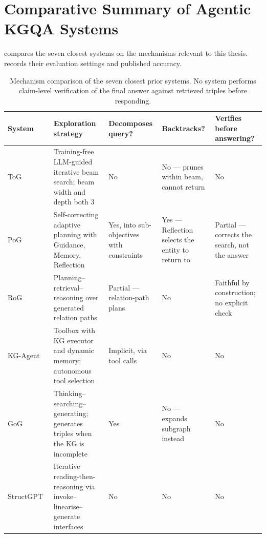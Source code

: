 \section{Comparative Summary of Agentic KGQA
Systems}\label{sec:comparison-table}

 compares the seven closest systems on the mechanisms
relevant to this thesis.  records their evaluation settings
and published accuracy.

\begin{table}[!tb]
  \begin{center}
    \caption[Mechanism comparison of the seven closest prior systems]{Mechanism
    comparison of the seven closest prior systems. No system performs
    claim-level verification of the final answer against retrieved triples
    before responding.}
    \label{tab:mechanisms}
    \footnotesize
    \begin{tabular}{|l|L{38mm}|L{22mm}|L{22mm}|L{25mm}|}
      \hline
      \textbf{System} & \textbf{Exploration strategy} & \textbf{Decomposes
      query?} & \textbf{Backtracks?} & \textbf{Verifies before answering?} \\
      \hline
      ToG~\cite{sun2024think} & Training-free LLM-guided iterative beam search;
      beam width and depth both 3 & No & No --- prunes within beam, cannot
      return & No \\
      \hline
      PoG~\cite{chen2024plan} & Self-correcting adaptive planning with Guidance,
      Memory, Reflection & Yes, into sub-objectives with constraints & Yes ---
      Reflection selects the entity to return to & Partial --- corrects the
      search, not the answer \\
      \hline
      RoG~\cite{luo2024reasoning} & Planning--retrieval--reasoning over
      generated relation paths & Partial --- relation-path plans & No &
      Faithful by
      construction; no explicit check \\
      \hline
      KG-Agent~\cite{jiang2024kgagent} & Toolbox with KG executor and dynamic
      memory; autonomous tool selection & Implicit, via tool calls & No & No \\
      \hline
      GoG~\cite{xu2024generate} & Thinking--searching--generating; generates
      triples when the KG is incomplete & Yes & No --- expands subgraph instead
      & No \\
      \hline
      StructGPT~\cite{jiang2023structgpt} & Iterative reading-then-reasoning via
      invoke--linearise--generate interfaces & No & No & No \\

\end{tabular}
\end{center}
\end{table}
